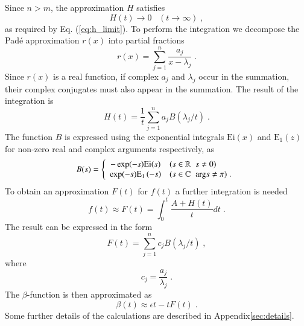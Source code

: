\documentclass[singlecolumn]{jpsj3}
\begin{document}
Since $n>m$, the approximation  $H$  satisfies
\begin{equation}
	H(t) \rightarrow 0 \;\;\; (t \rightarrow \infty) \;,
\end{equation}
as required by Eq. (\ref{eq:h_limit}). To perform the integration we decompose the Pad\'{e} approximation $r(x)$ into partial fractions
\begin{equation}
   r(x) = \sum_{j=1}^{n} \frac{a_j}{x-\lambda_j} \;.
\end{equation}
Since $r(x)$ is a real function, if complex $a_j$ and $\lambda_j$ occur in the summation,
their complex conjugates must also appear in the summation.
The result of the integration is
 \begin{equation}\label{eq:h_sum}
   H\left(t\right) = \frac{1}{t} \sum_{j=1}^{n} a_j B\left(\lambda_j/t\right) \;.
 \end{equation}
The function $B$ is expressed using the
exponential integrals $\mathrm{Ei}(x)$ and $\mathrm{E_1}(z)$ for non-zero real and complex arguments respectively\cite{Jeffrey04}, as
\begin{equation}\label{eq:def_B}
	B(s) = \left \{
		\begin{array}{cl}
		 - \exp(-s) \mathrm{Ei} ( s ) & (s \in \mathbb{R} \;\; s \neq 0)\\
		 \exp(-s)  \mathrm{E}_1 \left( -s \right) & (s \in \mathbb{C}\; \;  $arg$s\ne\pi) \;.
   		\end{array} \right.
\end{equation}
To obtain an approximation $F\left(t\right)$ for $f\left(t\right)$ a further integration is needed
\begin{equation}\label{eq:f_from_h}
    f\left(t\right) \approx  F\left( t \right) = \int_{0}^{t} \frac{A+H\left(t\right)}{t}dt \;.
\end{equation}
The result can be expressed in the form
\begin{equation}\label{eq:f_sum}
F\left(t\right) = \sum_{j=1}^{n} c_j B \left( \lambda_j / t \right) \;,
\end{equation}
where
\begin{equation}
  c_j = \frac{a_j}{\lambda_j} \;.
\end{equation}
The $\beta$-function is then approximated as
\begin{equation}\label{eq:beta_resum}
	\beta(t) \approx \epsilon t - tF\left(t\right) \;.
\end{equation}
Some further details of the calculations are described in Appendix\ref{sec:details}.
\end{document}
